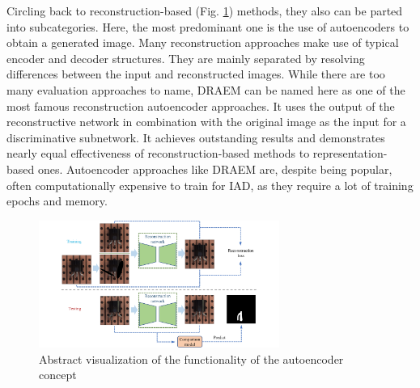 Circling back to reconstruction-based (Fig. \ref{fig:autoencoderviz}) methods, they also can be parted into subcategories. Here, the most predominant one is the use of autoencoders to obtain a generated image. Many 
reconstruction approaches make use of typical encoder and decoder structures. They are mainly separated by resolving differences between the input and reconstructed images. 
While there are too many evaluation approaches to name, DRAEM \cite{Zavrtanik_2021DRAEM} can be named here as one of the most famous reconstruction autoencoder approaches. It uses 
the output of the reconstructive network in combination with the original image as the input for a discriminative subnetwork. It achieves outstanding results and demonstrates nearly equal effectiveness 
of reconstruction-based methods to representation-based ones. Autoencoder approaches like DRAEM are, despite being popular, often computationally expensive to train for IAD, as they require a lot of 
training epochs and memory.

\begin{figure}[H]
\centering
\includegraphics[width=0.7\textwidth]{figures/approachvizgeneral/autoencoderbiz.jpg}
\caption{Abstract visualization of the functionality of the autoencoder concept \cite{liu2024deep}}
\label{fig:autoencoderviz}
\end{figure}


